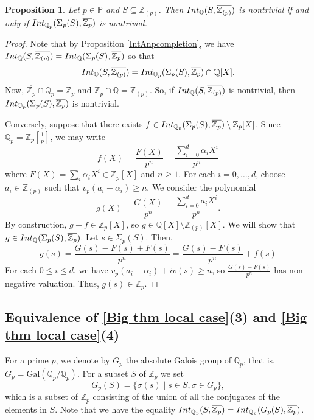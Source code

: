 \documentclass{article}
\newtheorem{Prop}[equation]{Proposition}
\theoremstyle{definition}\newtheorem{Def}[equation]{Definition}
\theoremstyle{definition}\newtheorem{Ques}[equation]{Question}
\theoremstyle{definition}\newtheorem{Conj}[equation]{Conjecture}
\theoremstyle{definition}\newtheorem{Not}[equation]{Notation}
\newcommand{\Q}{\mathbb{Q}}
\newcommand{\oZ}{\overline{\Z}}
\newcommand{\Z}{\mathbb{Z}}
\newcommand{\oZp}{\overline{\Z_p}}
\newcommand{\oQZp}{\overline{\Z_{(p)}}}
\newcommand{\oQp}{\overline{\Q_p}}
\newcommand{\Int}{\textnormal{Int}}
\newcommand{\IntQ}{\Int_{\Q}}
\newcommand{\Gal}{\text{Gal}}
\newcommand{\PP}{\mathbb{P}}
\numberwithin{equation}{section}
\begin{document}



\begin{Prop}\label{2 iff 3}
Let $p \in \PP$ and $S \subseteq \oQZp$. Then $\IntQ(S,\oQZp)$ is nontrivial if and only if $\Int_{\Q_p}(\Sigma_p(S),\oZp)$ is nontrivial. 
\end{Prop}
\begin{proof}
Note that by Proposition \ref{IntAnpcompletion},  we have $\IntQ(S,\oQZp)=\IntQ(\Sigma_p(S),\oZp)$ so that
\begin{equation*}
\IntQ(S,\oQZp)=\Int_{\Q_p}(\Sigma_p(S),\oZp)\cap\Q[X].
\end{equation*}
Now, $\oZp \cap \Q_p = \Z_p$ and $\Z_p \cap \Q = \Z_{(p)}$. So, if $\IntQ(S,\oQZp)$ is nontrivial, then $\Int_{\Q_p}(\Sigma_p(S),\oZp)$ is nontrivial.

Conversely, suppose that there exists $f\in\Int_{\Q_p}(\Sigma_p(S),\oZp)\setminus\Z_p[X]$. Since $\Q_p=\Z_p[\frac{1}{p}]$, we may write
\begin{equation*}
f(X)=\frac{F(X)}{p^n}=\frac{\sum_{i=0}^d \alpha_i X^i}{p^n}
\end{equation*}
where $F(X)=\sum_i\alpha_iX^i\in\Z_p[X]$ and $n\geq1$. For each $i=0, \ldots, d$, choose $a_i \in \Z_{(p)}$ such that $v_p(a_i - \alpha_i) \geq n$. We consider the polynomial
\begin{equation*}
g(X)=\frac{G(X)}{p^n}=\frac{\sum_{i=0}^d a_i X^i}{p^n}.
\end{equation*}
By construction, $g-f \in \Z_p[X]$, so $g \in \Q[X]\setminus \Z_{(p)}[X]$. We will show that $g\in \IntQ(\Sigma_p(S),\oZp)$. Let $s\in \Sigma_p(S)$. Then,
\begin{equation*}
g(s)=\frac{G(s)-F(s)+F(s)}{p^n}=\frac{G(s)-F(s)}{p^n}+f(s)
\end{equation*}
For each $0\leq i \leq d$, we have $v_p(a_i-\alpha_i)+iv(s)\geq n$, so  $\frac{G(s)-F(s)}{p^n}$ has non-negative valuation. Thus, $g(s) \in \oZ_p$.
\end{proof}

\subsection*{Equivalence of \ref{Big thm local case}(3) and \ref{Big thm local case}(4)}
For a prime $p$, we denote by $G_p$ the absolute Galois group of $\Q_p$, that is, $G_p=\Gal(\oQp/\Q_p)$. For a subset $S$ of $\oZp$ we set
\begin{equation*}
G_p(S)=\{\sigma(s)\mid s\in S,\sigma\in G_p\},
\end{equation*}
which is a subset of $\oZp$ consisting of the union of all the conjugates of the elements in $S$. Note that we have the equality $\Int_{\Q_p}(S,\oZp)=\Int_{\Q_p}(G_p(S),\oZp)$.
\end{document}
